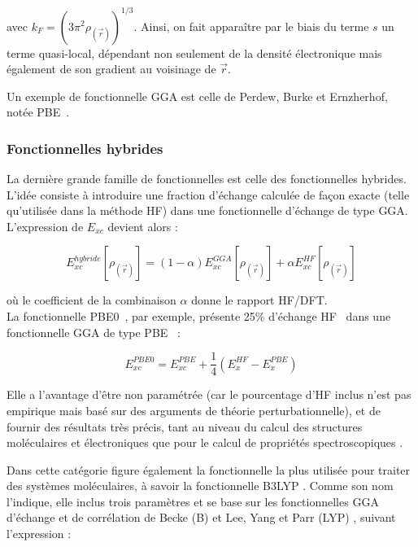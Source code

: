 	\noindent avec $k_{F} = (3 \pi^{2} \rho_{(\vec{r})})^{1/3}$. Ainsi, on fait apparaître par le biais du terme $s$ un terme quasi-local, dépendant non seulement de la densité électronique mais également de son gradient au voisinage de $\vec{r}$.
	
	Un exemple de fonctionnelle GGA est celle de Perdew, Burke et Ernzherhof, notée PBE~\cite{perdew1996generalized}.
	
	\subsubsection{Fonctionnelles hybrides}
	
	La dernière grande famille de fonctionnelles est celle des fonctionnelles hybrides. L’idée consiste à introduire une fraction d’échange calculée de façon exacte (telle qu’utilisée dans la méthode HF) dans une fonctionnelle d’échange de type GGA. L’expression de $E_{xc}$ devient alors :
	
	\begin{equation}
	E_{xc}^{hybride}[\rho_{(\vec{r})}] = (1- \alpha) E_{xc}^{GGA}[\rho_{(\vec{r})}] + \alpha E_{xc}^{HF}[\rho_{(\vec{r})}]
	\end{equation}
	
	\noindent où le coefficient de la combinaison $\alpha$ donne le rapport HF/DFT. \\
	La fonctionnelle PBE0~\cite{adamo1999toward}, par exemple, présente 25\% d’échange HF~\cite{adamo1997toward} dans une fonctionnelle GGA de type PBE~\cite{perdew1996generalized} :
	
	\begin{equation}
	E_{xc}^{PBE0} = E_{xc}^{PBE} + \frac{1}{4} (E_{x}^{HF} - E_{x}^{PBE})
	\end{equation}
	
	Elle a l’avantage d’être non paramétrée (car le pourcentage d’HF inclus n’est pas empirique mais basé sur des arguments de théorie perturbationnelle), et de fournir des résultats très précis, tant au niveau du calcul des structures moléculaires et électroniques que pour le calcul de propriétés spectroscopiques \cite{adamo1999toward}.
	
	Dans cette catégorie figure également la fonctionnelle la plus utilisée pour traiter des systèmes moléculaires, à savoir la fonctionnelle B3LYP \cite{becke1993density}. Comme son nom l’indique, elle inclus trois paramètres et se base sur les fonctionnelles GGA d’échange et de corrélation de Becke (B) \cite{becke1988density} et Lee, Yang et Parr (LYP) \cite{chengteh1988development}, suivant l’expression :
	
